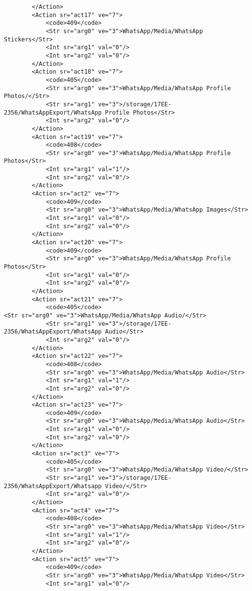\begin{verbatim}
        </Action>
        <Action sr="act17" ve="7">
            <code>409</code>
            <Str sr="arg0" ve="3">WhatsApp/Media/WhatsApp Stickers</Str>
            <Int sr="arg1" val="0"/>
            <Int sr="arg2" val="0"/>
        </Action>
        <Action sr="act18" ve="7">
            <code>405</code>
            <Str sr="arg0" ve="3">WhatsApp/Media/WhatsApp Profile Photos/</Str>
            <Str sr="arg1" ve="3">/storage/17EE-2356/WhatsAppExport/WhatsApp Profile Photos</Str>
            <Int sr="arg2" val="0"/>
        </Action>
        <Action sr="act19" ve="7">
            <code>408</code>
            <Str sr="arg0" ve="3">WhatsApp/Media/WhatsApp Profile Photos</Str>
            <Int sr="arg1" val="1"/>
            <Int sr="arg2" val="0"/>
        </Action>
        <Action sr="act2" ve="7">
            <code>409</code>
            <Str sr="arg0" ve="3">WhatsApp/Media/WhatsApp Images</Str>
            <Int sr="arg1" val="0"/>
            <Int sr="arg2" val="0"/>
        </Action>
        <Action sr="act20" ve="7">
            <code>409</code>
            <Str sr="arg0" ve="3">WhatsApp/Media/WhatsApp Profile Photos</Str>
            <Int sr="arg1" val="0"/>
            <Int sr="arg2" val="0"/>
        </Action>
        <Action sr="act21" ve="7">
            <code>405</code>
<Str sr="arg0" ve="3">WhatsApp/Media/WhatsApp Audio/</Str>
            <Str sr="arg1" ve="3">/storage/17EE-2356/WhatsAppExport/WhatsApp Audio</Str>
            <Int sr="arg2" val="0"/>
        </Action>
        <Action sr="act22" ve="7">
            <code>408</code>
            <Str sr="arg0" ve="3">WhatsApp/Media/WhatsApp Audio</Str>
            <Int sr="arg1" val="1"/>
            <Int sr="arg2" val="0"/>
        </Action>
        <Action sr="act23" ve="7">
            <code>409</code>
            <Str sr="arg0" ve="3">WhatsApp/Media/WhatsApp Audio</Str>
            <Int sr="arg1" val="0"/>
            <Int sr="arg2" val="0"/>
        </Action>
        <Action sr="act3" ve="7">
            <code>405</code>
            <Str sr="arg0" ve="3">WhatsApp/Media/WhatsApp Video/</Str>
            <Str sr="arg1" ve="3">/storage/17EE-2356/WhatsAppExport/Whatsapp Video/</Str>
            <Int sr="arg2" val="0"/>
        </Action>
        <Action sr="act4" ve="7">
            <code>408</code>
            <Str sr="arg0" ve="3">WhatsApp/Media/WhatsApp Video</Str>
            <Int sr="arg1" val="1"/>
            <Int sr="arg2" val="0"/>
        </Action>
        <Action sr="act5" ve="7">
            <code>409</code>
            <Str sr="arg0" ve="3">WhatsApp/Media/WhatsApp Video</Str>
            <Int sr="arg1" val="0"/>

\end{verbatim}
